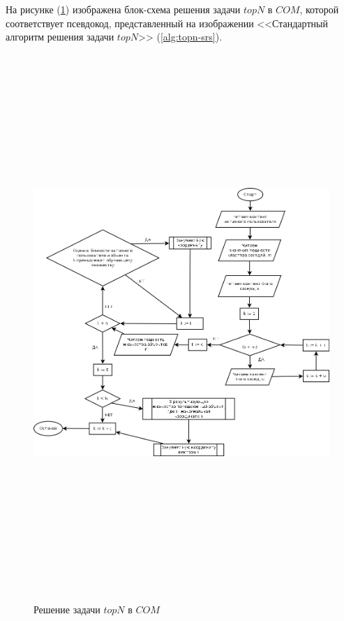 На рисунке (\ref{dia:topn-srs}) изображена блок-схема решения задачи $topN$ в
$COM$, которой соответствует псевдокод, представленный на изображении <<Стандартный алгоритм решения задачи $topN$>>  (\ref{alg:topn-srs}).
\begin{figure}[htb]
	\caption{Решение задачи $topN$ в $COM$}
	\begin{center}
		\label{dia:topn-srs}
		\includegraphics[width=7in,height=8in]{pics/algs/topn-srs.png}
	\end{center}
\end{figure}


